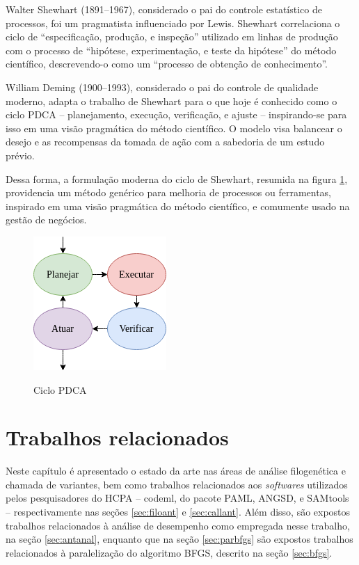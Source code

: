 \documentclass[cic,tc]{iiufrgs}
\begin{document}
Walter Shewhart (1891--1967), considerado o pai do controle estatístico de
processos, foi um pragmatista influenciado por Lewis. Shewhart correlaciona o
ciclo de ``especificação, produção, e inspeção'' utilizado em linhas de
produção com o processo de ``hipótese, experimentação, e teste da hipótese'' do
método científico, descrevendo-o como um ``processo de obtenção de
conhecimento''. 

William Deming (1900--1993), considerado o pai do controle de qualidade
moderno, adapta o trabalho de Shewhart para o que hoje é conhecido como o ciclo
PDCA -- planejamento, execução, verificação, e ajuste -- inspirando-se para
isso em uma visão pragmática do método científico. O modelo visa balancear o
desejo e as recompensas da tomada de ação com a sabedoria de um estudo prévio.

Dessa forma, a formulação moderna do ciclo de Shewhart, resumida na figura
\ref{fig:pdca_orig}, providencia um método genérico para melhoria de processos ou
ferramentas, inspirado em uma visão pragmática do método científico, e
comumente usado na gestão de negócios.

\begin{figure} \caption{Ciclo PDCA} \begin{center}
\includegraphics[width=0.25\linewidth]{img/pdca_orig.png} \end{center}
 \label{fig:pdca_orig} \end{figure}


%
%
%
%

\chapter{Trabalhos relacionados}
\label{chap:anteriores}

Neste capítulo é apresentado o estado da arte nas áreas de análise filogenética
e chamada de variantes, bem como trabalhos relacionados aos \textit{softwares}
utilizados pelos pesquisadores do HCPA -- codeml, do pacote PAML, ANGSD, e
SAMtools -- respectivamente nas seções \ref{sec:filoant} e \ref{sec:callant}.
Além disso, são expostos trabalhos relacionados à análise de desempenho como
empregada nesse trabalho, na seção \ref{sec:antanal}, enquanto que na seção
\ref{sec:parbfgs} são expostos trabalhos relacionados à paralelização do
algoritmo BFGS, descrito na seção \ref{sec:bfgs}.
\end{document}

